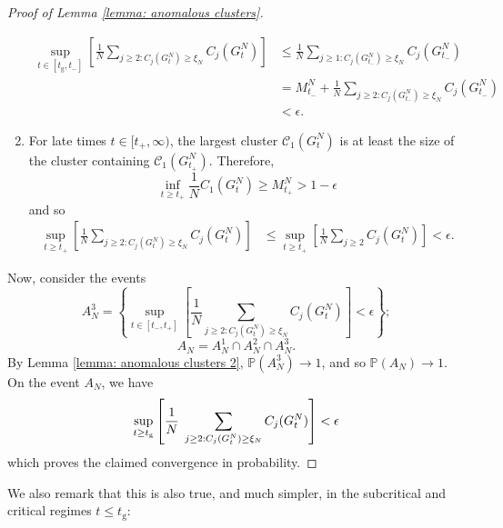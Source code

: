 \documentclass[11pt, notitlepage]{article}
\begin{document}
\begin{proof}[Proof of Lemma \ref{lemma: anomalous clusters}]
\begin{enumerate}[label=\roman{*}).]
    \begin{equation} \begin{split}
        \sup_{t\in [t_\mathrm{g}, t_-]} \left[\frac{1}{N} \sum_{j\geq 2: C_j(G^N_t)\geq \xi_N} C_j(G^N_t)\right] & \leq \frac{1}{N}\sum_{j\geq 1: C_j(G^N_{t_-}) \geq \xi_N} C_j(G^N_{t_-}) \\ & = M^N_{t_-}+\frac{1}{N}\sum_{j\geq 2: C_j(G^N_{t_-}) \geq \xi_N} C_j(G^N_{t_-})\\ & <\epsilon.
   \end{split} \end{equation}
    \item For late times $t\in [t_+, \infty)$, the largest cluster $\mathcal{C}_1(G^N_t)$ is at least the size of the cluster containing $\mathcal{C}_1(G^N_{t_+})$. Therefore, \begin{equation}
        \inf_{t\geq t_+} \frac{1}{N}C_1(G^N_t)\geq M^N_{t_+}>1-\epsilon
    \end{equation} and so 
    \begin{equation}\begin{split}
        \sup_{t\geq t_+} \left[\frac{1}{N} \sum_{j\geq 2: C_j(G^N_t)\geq \xi_N} C_j(G^N_t)\right] & \leq \sup_{t\geq t_+} \left[ \frac{1}{N} \sum_{j\geq 2} C_j(G^N_t)\right]  <\epsilon. \end{split}
    \end{equation}
\end{enumerate}
Now, consider the events
\begin{equation}
    A^3_N=\left\{\sup_{t\in [t_-, t_+]}\left[\frac{1}{N}\sum_{j\geq 2: C_j(G^N_{t})\geq \xi_N} C_j(G^N_{t})\right]<\epsilon \right\};\end{equation}
    \begin{equation}
    A_N=A^1_N\cap A^2_N\cap A^3_N.\end{equation} By Lemma \ref{lemma: anomalous clusters 2}, $\mathbb{P}(A^3_N)\rightarrow 1$, and so $\mathbb{P}(A_N) \rightarrow 1$. On the event $A_N$, we have \begin{equation}
        \sup_{t\geq t_\mathrm{g}}\left[\frac{1}{N}\hspace{0.1cm} \sum_{j\geq 2: C_j(G^N_t)\geq \xi_N} C_j(G^N_t)\right] <\epsilon
    \end{equation} which proves the claimed convergence in probability. 
\end{proof} 
We also remark that this is also true, and much simpler, in the subcritical and critical regimes $t\le t_\mathrm{g}:$ 
\end{document}
